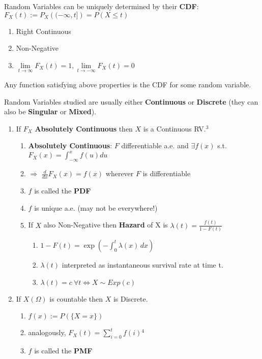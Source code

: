 \documentclass[a4paper,portrait,columns=2, hidelinks]{cheatsheet}
\begin{document}
Random Variables can be uniquely determined by their \textbf{CDF}:
\( F_X(t) := P_X\left((-\infty,t]\right) = P(X \le t) \)
\begin{enumerate}
	\item Right Continuous
	\item Non-Negative
	\item \(\lim\limits_{t \to \infty} F_X(t) = 1, \lim\limits_{t \to -\infty} F_X(t) = 0\)
\end{enumerate}
Any function satisfying above properties is the CDF for some random variable.

\hfill

Random Variables studied are usually either \textbf{Continuous} or \textbf{Discrete} (they can also be \textbf{Singular} or \textbf{Mixed}).
\begin{enumerate}
	\item If \( F_X\) \textbf{Absolutely Continuous} then \(X\) is a Continuous RV.\hyperref[sec:ft3]{$^3$}
	\begin{enumerate}
		\item \textbf{Absolutely Continuous}: $F$ differentiable a.e. and $\exists f(x)$ s.t. $F_X(x) = \int_{-\infty}^{x} f(u) du$
		\item $\Rightarrow$ $\frac{d}{dx}F_X(x) = f(x)$ wherever $F$ is differentiable
		\item \(f\) is called the \textbf{PDF}
		\item $f$ is unique a.e. (may not be everywhere!)
		\item If \(X\) also Non-Negative then \textbf{Hazard} of X is \( \lambda(t) = \frac{f(t)}{1 - F(t)}\)	
		\begin{enumerate}
			\item \(1 - F(t) = \exp\left(-\int_0^t \lambda(x)\,dx \right) \)
			\item \(\lambda(t)\) interpreted as instantaneous survival rate at time t.
			\item \( \lambda(t) = c \ \forall t \iff X \sim Exp(c) \)
		\end{enumerate}
	\end{enumerate}
	\item If \(X(\Omega)\) is countable then \(X\) is Discrete.
	\begin{enumerate}
		\item \(f(x):=P(\{X=x\})\)
		\item analogously, $F_{X}(t) = \sum_{i=0}^{t}f(i)$\hyperref[sec:ft4]{$^4$}
		\item \(f\) is called the \textbf{PMF}
	\end{enumerate}
\end{enumerate}
\end{document}
